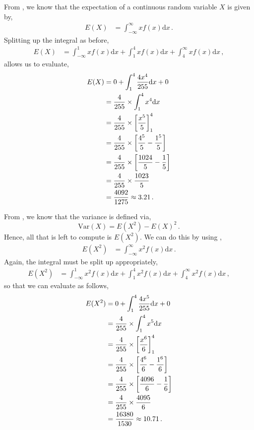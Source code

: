 \begin{subquestions}
\begin{subsubquestions}
From , we know that the expectation of a continuous random variable $X$ is given by,
\begin{align}
	E(X) & = \int_{-\infty}^{\infty} x f(x)\mathrm{d}x \,.
\end{align}
Splitting up the integral as before,
\begin{align}
E(X) & = \int_{-\infty}^{1}xf(x)\mathrm{d}x + \int_{1}^{4} xf(x)\mathrm{d}x + \int_{4}^{\infty} xf(x)\mathrm{d}x \,,
\end{align}
allows us to evaluate,
\begin{align}
E(X) & = 0 + \int_{1}^{4} \frac{4x^4}{255} \mathrm{d}x + 0 \nonumber \\
	     & = \frac{4}{255} \times \int_{1}^{4} x^4 \mathrm{d}x \nonumber \\
	     & = \frac{4}{255} \times \left[\frac{x^5}{5}\right]^4_1 \nonumber \\
	     & = \frac{4}{255} \times \left[\frac{4^5}{5} - \frac{1^5}{5}\right] \nonumber \\
	     & = \frac{4}{255} \times \left[\frac{1024}{5} - \frac{1}{5}\right] \nonumber \\
	     & = \frac{4}{255} \times \frac{1023}{5} \nonumber \\
	     & = \frac{4092}{1275} \approx 3.21 \,. 
\end{align}

From , we know that the variance is defined via,
\begin{equation}
	\text{Var}(X) = E(X^2) - {E(X)}^2 \,. \label{2005:q3:CRVar}
\end{equation}
Hence, all that is left to compute is $E(X^2)$. We can do this by using , 
\begin{align}
	E(X^2) & = \int_{-\infty}^{\infty} x^2 f(x)\mathrm{d}x \,.
\end{align}
Again, the integral must be split up appropriately,
\begin{align} 
E(X^2) & = \int_{-\infty}^{1} x^2 f(x)\mathrm{d}x+\int_{1}^{4} x^2 f(x)\mathrm{d}x+\int_{4}^{\infty} x^2 f(x)\mathrm{d}x \,,
\end{align}
so that we can evaluate as follows,
\begin{align}
E(X^2) & = 0 + \int_{1}^{4} \frac{4x^5}{255} \mathrm{d}x + 0 \nonumber \\
	& = \frac{4}{255} \times \int_{1}^{4} x^5 \mathrm{d}x \nonumber \\
	& = \frac{4}{255} \times \left[\frac{x^6}{6}\right]^4_1 \nonumber \\
	& = \frac{4}{255} \times \left[\frac{4^6}{6} - \frac{1^6}{6}\right] \nonumber \\
	& = \frac{4}{255} \times \left[\frac{4096}{6} - \frac{1}{6}\right] \nonumber \\
	& = \frac{4}{255} \times \frac{4095}{6} \nonumber \\
	& = \frac{16380}{1530} \approx 10.71 \,.
\end{align}	


\end{subsubquestions}
\end{subquestions}
